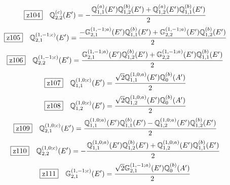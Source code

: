 \documentclass[fleqn,10pt,landscape]{jsarticle}
\begin{document}
\begin{dmath*}
\hspace*{3mm}\fbox{z104}\quad \mathbb{Q}_{2,2}^{(c)}(E^{\prime})=- \frac{\mathbb{Q}_{1,1}^{(a)}(E^{\prime}) \mathbb{Q}_{1,2}^{(b)}(E^{\prime}) + \mathbb{Q}_{1,2}^{(a)}(E^{\prime}) \mathbb{Q}_{1,1}^{(b)}(E^{\prime})}{2}
\end{dmath*}
\begin{dmath*}
\hspace*{3mm}\fbox{z105}\quad \mathbb{Q}_{2,1}^{(1,-1;c)}(E^{\prime})=\frac{- \mathbb{G}_{2,1}^{(1,-1;a)}(E^{\prime}) \mathbb{Q}_{1,1}^{(b)}(E^{\prime}) + \mathbb{G}_{2,2}^{(1,-1;a)}(E^{\prime}) \mathbb{Q}_{1,2}^{(b)}(E^{\prime})}{2}
\end{dmath*}
\begin{dmath*}
\hspace*{3mm}\fbox{z106}\quad \mathbb{Q}_{2,2}^{(1,-1;c)}(E^{\prime})=\frac{\mathbb{G}_{2,1}^{(1,-1;a)}(E^{\prime}) \mathbb{Q}_{1,2}^{(b)}(E^{\prime}) + \mathbb{G}_{2,2}^{(1,-1;a)}(E^{\prime}) \mathbb{Q}_{1,1}^{(b)}(E^{\prime})}{2}
\end{dmath*}
\begin{dmath*}
\hspace*{3mm}\fbox{z107}\quad \mathbb{Q}_{1,1}^{(1,0;c)}(E^{\prime})=\frac{\sqrt{2} \mathbb{Q}_{1,1}^{(1,0;a)}(E^{\prime}) \mathbb{Q}_{0}^{(b)}(A^{\prime})}{2}
\end{dmath*}
\begin{dmath*}
\hspace*{3mm}\fbox{z108}\quad \mathbb{Q}_{1,2}^{(1,0;c)}(E^{\prime})=\frac{\sqrt{2} \mathbb{Q}_{1,2}^{(1,0;a)}(E^{\prime}) \mathbb{Q}_{0}^{(b)}(A^{\prime})}{2}
\end{dmath*}
\begin{dmath*}
\hspace*{3mm}\fbox{z109}\quad \mathbb{Q}_{2,1}^{(1,0;c)}(E^{\prime})=\frac{\mathbb{Q}_{1,1}^{(1,0;a)}(E^{\prime}) \mathbb{Q}_{1,1}^{(b)}(E^{\prime}) - \mathbb{Q}_{1,2}^{(1,0;a)}(E^{\prime}) \mathbb{Q}_{1,2}^{(b)}(E^{\prime})}{2}
\end{dmath*}
\begin{dmath*}
\hspace*{3mm}\fbox{z110}\quad \mathbb{Q}_{2,2}^{(1,0;c)}(E^{\prime})=- \frac{\mathbb{Q}_{1,1}^{(1,0;a)}(E^{\prime}) \mathbb{Q}_{1,2}^{(b)}(E^{\prime}) + \mathbb{Q}_{1,2}^{(1,0;a)}(E^{\prime}) \mathbb{Q}_{1,1}^{(b)}(E^{\prime})}{2}
\end{dmath*}
\begin{dmath*}
\hspace*{3mm}\fbox{z111}\quad \mathbb{G}_{2,1}^{(1,-1;c)}(E^{\prime})=\frac{\sqrt{2} \mathbb{G}_{2,1}^{(1,-1;a)}(E^{\prime}) \mathbb{Q}_{0}^{(b)}(A^{\prime})}{2}
\end{dmath*}
\end{document}

